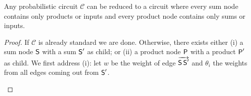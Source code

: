 \begin{theorem}[Standardization]
  \label{thm:standard}
  Any probabilistic circuit $\mathcal{C}$ can be reduced to a circuit where every sum node contains
  only products or inputs and every product node contains only sums or inputs.
\end{theorem}
\begin{proof}
  If $\mathcal{C}$ is already standard we are done. Otherwise, there exists either (i) a sum node
  $\operatorname{\textup{\textsf{S}}}$ with a sum $\operatorname{\textup{\textsf{S}}}'$ as child; or (ii) a product node $\operatorname{\textup{\textsf{P}}}$ with a product $\operatorname{\textup{\textsf{P}}}'$ as
  child. We first address (i): let $w$ be the weight of edge $\overrightarrow{\operatorname{\textup{\textsf{S}}}\operatorname{\textup{\textsf{S}}}'}$ and $\theta_i$
  the weights from all edges coming out from $\operatorname{\textup{\textsf{S}}}'$.
  \begin{center}
\end{center}
\end{proof}
